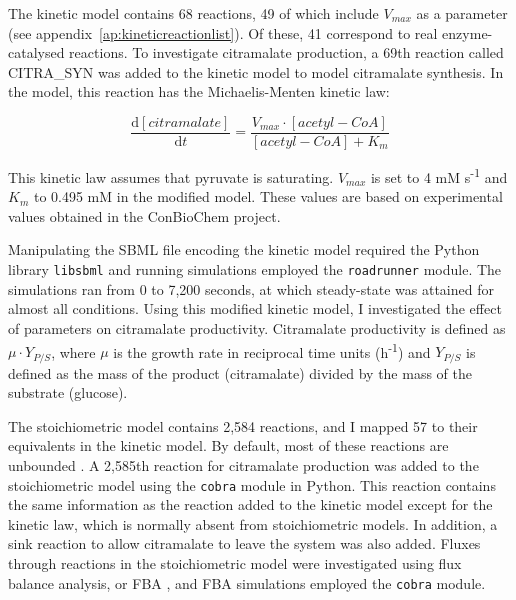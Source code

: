 \documentclass[parskip=full, numbers=noenddot]{scrreprt}
\begin{document}
The kinetic model contains 68 reactions, 49 of which include $V_{max}$ as a parameter (see appendix~\ref{ap:kineticreactionlist}). Of these, 41 correspond to real enzyme-catalysed reactions.
To investigate citramalate production, a 69th reaction called CITRA\_SYN was added to the kinetic model to model citramalate synthesis.  In the model, this reaction has the Michaelis-Menten kinetic law:

\[
  \frac{\mathrm{d}[citramalate]}{\mathrm{d}t} = 
  \frac{V_{max} \cdot [acetyl-CoA]}{[acetyl-CoA] + K_{m}}
\]

This kinetic law assumes that pyruvate is saturating. $V_{max}$ is set to 4 mM s\textsuperscript{-1} and $K_{m}$ to 0.495 mM in the modified model. These values are based on experimental values obtained in the ConBioChem project.

Manipulating the SBML file encoding the kinetic model required the Python library \texttt{libsbml} \citep{bornstein_libsbml:_2008} and running simulations employed the \texttt{roadrunner} \citep{somogyi_libroadrunner:_2015} module. The simulations ran from 0 to 7,200 seconds, at which steady-state was attained for almost all conditions.
Using this modified kinetic model, I investigated the effect of parameters on citramalate productivity. Citramalate productivity is defined as $\mu \cdot Y_{P/S}$, where $\mu$ is the growth rate in reciprocal time units (h\textsuperscript{-1}) and $Y_{P/S}$ is defined as the mass of the product (citramalate) divided by the mass of the substrate (glucose).


The stoichiometric model contains 2,584 reactions, and I mapped 57 to their equivalents in the kinetic model. By default, most of these reactions are unbounded \citep{orth_comprehensive_2011}.
A 2,585th reaction for citramalate production was added to the stoichiometric model using the \texttt{cobra} module \citep{ebrahim_cobrapy:_2013} in Python. This reaction contains the same information as the reaction added to the kinetic model except for the kinetic law, which is normally absent from stoichiometric models. In addition, a sink reaction to allow citramalate to leave the system was also added.
Fluxes through reactions in the stoichiometric model were investigated using flux balance analysis, or FBA \citep{orth_what_2010}, and FBA simulations employed the \texttt{cobra} module.
\end{document}
